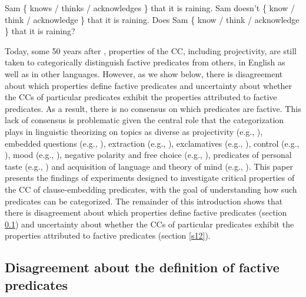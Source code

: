 \documentclass[11pt,fleqn]{article}
\newcommand{\6}{\mbox{$[\hspace*{-.6mm}[$}}
\newcommand{\9}{\mbox{$]\hspace*{-.6mm}]$}}
\begin{document}
\begin{exe}
\ex\label{kk1}
\begin{xlist}
\ex Sam \{ knows / thinks / acknowledges \} that it is raining.
\ex Sam doesn't \{ know / think / acknowledge \} that it is raining.
\ex Does Sam \{ know / think / acknowledge \} that it is raining?
\end{xlist}
\end{exe}
Today, some 50 years after \citealt{kiparsky-kiparsky70}, properties of the CC, including projectivity, are still taken to categorically distinguish factive predicates from others, in English as well as in other languages. However, as we show below, there is disagreement about which properties define factive predicates and uncertainty about whether the CCs of particular predicates exhibit the properties attributed to factive predicates. As a result, there is no consensus on which predicates are factive. This lack of consensus is problematic given the central role that the categorization plays in linguistic theorizing on topics as diverse as projectivity (e.g., \citealt{karttunen-peters79,vds92}), embedded questions (e.g., \citealt{hintikka1975,guerzoni-sharvit2007,spector-egre2015}), extraction (e.g., \citealt{hukari-levine1995,rooryck2000,abrusan2014}), exclamatives (e.g., \citealt{zanuttini-portner2003}), control (e.g., \citealt{landau2001}), mood (e.g., \citealt{van-gelderen2004,givon95,heycock2006}), negative polarity and free choice (e.g., \citealt{giannakidou1998,giannakidou2001}), predicates of personal taste (e.g., \citealt{lasersohn2009}) and acquisition of language and theory of mind (e.g., \citealt{devillers2005}). 
This paper presents the findings of experiments designed to investigate critical properties of the CC of clause-embedding predicates, with the goal of understanding how such predicates can be categorized. The remainder of this introduction shows that there is disagreement about which properties define factive predicates (section \ref{s11}) and uncertainty about whether the CCs of particular predicates exhibit the properties attributed to factive predicates (section \ref{s12}).

\subsection{Disagreement about the definition of factive predicates}\label{s11}
\end{document}
